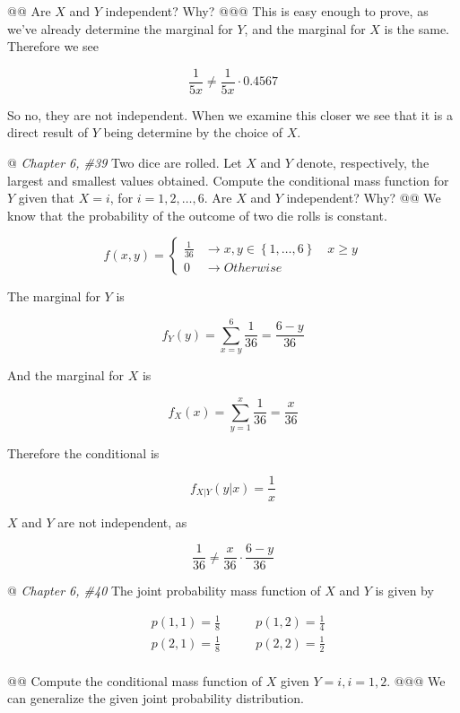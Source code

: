 \documentclass[11pt]{article}\usepackage[]{graphicx}\usepackage[]{xcolor}
\begin{document}
\begin{easylist}[enumerate]
    @@ Are $X$ and $Y$ independent? Why?
    @@@ This is easy enough to prove, as we've already determine the marginal for $Y$, and the marginal for $X$ is the
    same. Therefore we see

    \[
        \frac{1}{5x} \neq \frac{1}{5x} \cdot 0.4567
    \]

    So no, they are not independent. When we examine this closer we see that it is a direct result of $Y$ being
    determine by the choice of $X$.

    @ \textit{Chapter 6, \#39} Two dice are rolled. Let $X$ and $Y$ denote, respectively, the largest and smallest
    values obtained. Compute the conditional mass function for $Y$ given that $X=i$, for $i = 1, 2, \ldots, 6$. Are $X$
    and $Y$ independent? Why?
    @@ We know that the probability of the outcome of two die rolls is constant.

    \[
        f(x, y) =
        \begin{cases}
            \frac{1}{36} &\to x, y \in \left\{ 1, \ldots, 6 \right\} \quad x \ge y\\
            0 &\to Otherwise
        \end{cases}
    \]

    The marginal for $Y$ is

    \[
        f_Y(y) = \sum_{x = y}^6 \frac{1}{36} = \frac{6 - y}{36}
    \]

    And the marginal for $X$ is

    \[
        f_X(x) = \sum_{y = 1}^x \frac{1}{36} = \frac{x}{36}
    \]

    Therefore the conditional is

    \[
        f_{X|Y} \left( y|x \right) = \frac{1}{x}
    \]

    $X$ and $Y$ are not independent, as

    \[
        \frac{1}{36} \neq \frac{x}{36} \cdot \frac{6 - y}{36}
    \]

    @ \textit{Chapter 6, \#40} The joint probability mass function of $X$ and $Y$ is given by

    \[
        \begin{aligned}
            &p\left( 1, 1 \right) = \frac{1}{8} \qquad &p\left( 1, 2 \right) = \frac{1}{4}\\
            &p\left( 2, 1 \right) = \frac{1}{8} \qquad &p\left( 2, 2 \right) = \frac{1}{2}\\
        \end{aligned}
    \]

    @@ Compute the conditional mass function of $X$ given $Y = i, i = 1, 2$.
    @@@ We can generalize the given joint probability distribution.


\end{easylist}
\end{document}
